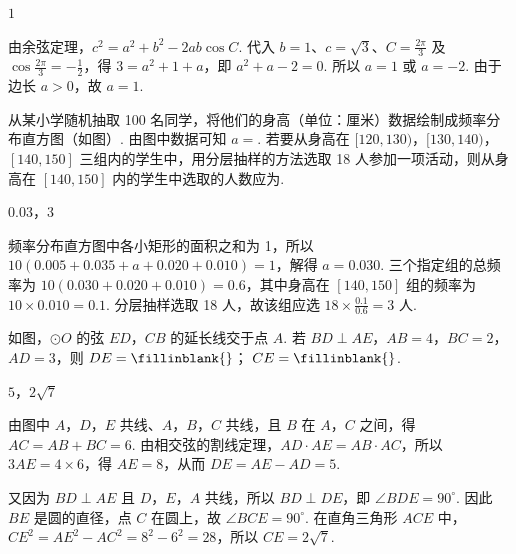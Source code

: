 \begin{answer}
\(1\)
\end{answer}

\begin{solution}
由余弦定理，\(c^{2}=a^{2}+b^{2}-2ab\cos C\). 代入 \(b=1\)、\(c=\sqrt{3}\)、\(C=\frac{2\pi}{3}\) 及 \(\cos\frac{2\pi}{3}=-\frac12\)，得 \(3=a^{2}+1+a\)，即 \(a^{2}+a-2=0\). 所以 \(a=1\) 或 \(a=-2\). 由于边长 \(a>0\)，故 \(a=1\).
\end{solution}

\begin{problem}
从某小学随机抽取 100 名同学，将他们的身高（单位：厘米）数据绘制成频率分布直方图（如图）. 由图中数据可知 \(a = \)\fillinblank{}. 若要从身高在 \([120, 130)\)，\([130, 140)\)，\([140, 150]\) 三组内的学生中，用分层抽样的方法选取 18 人参加一项活动，则从身高在 \([140, 150]\) 内的学生中选取的人数应为\fillinblank{}.

\end{problem}

\begin{answer}
\(0.03\)，\(3\)
\end{answer}

\begin{solution}
频率分布直方图中各小矩形的面积之和为 1，所以 \(10(0.005+0.035+a+0.020+0.010)=1\)，解得 \(a=0.030\). 三个指定组的总频率为 \(10(0.030+0.020+0.010)=0.6\)，其中身高在 \([140,150]\) 组的频率为 \(10\times0.010=0.1\). 分层抽样选取 18 人，故该组应选 \(18\times\frac{0.1}{0.6}=3\) 人.
\end{solution}

\begin{problem}
如图，\(\odot O\) 的弦 \(ED\)，\(CB\) 的延长线交于点 \(A\). 若 \(BD \perp AE\)，\(AB = 4\)，\(BC = 2\)，\(AD = 3\)，则 \(DE =\fillinblank{}\)； \(CE =\fillinblank{}\).

\end{problem}

\begin{answer}
\(5\)，\(2\sqrt{7}\)
\end{answer}

\begin{solution}
由图中 \(A\)，\(D\)，\(E\) 共线、\(A\)，\(B\)，\(C\) 共线，且 \(B\) 在 \(A\)，\(C\) 之间，得 \(AC=AB+BC=6\). 由相交弦的割线定理，\(AD\cdot AE=AB\cdot AC\)，所以 \(3AE=4\times6\)，得 \(AE=8\)，从而 \(DE=AE-AD=5\).

又因为 \(BD\perp AE\) 且 \(D\)，\(E\)，\(A\) 共线，所以 \(BD\perp DE\)，即 \(\angle BDE=90^\circ\). 因此 \(BE\) 是圆的直径，点 \(C\) 在圆上，故 \(\angle BCE=90^\circ\). 在直角三角形 \(ACE\) 中，\(CE^{2}=AE^{2}-AC^{2}=8^{2}-6^{2}=28\)，所以 \(CE=2\sqrt{7}\).
\end{solution}

